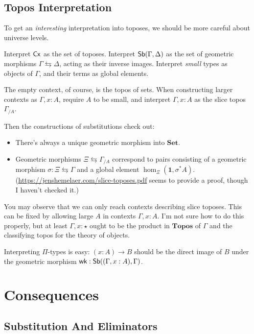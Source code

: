 \documentclass{article}
\begin{document}
\subsection{Topos Interpretation}

To get an \emph{interesting} interpretation into toposes, we should be more careful about universe levels.

Interpret \(\mathsf{Cx}\) as the set of toposes. Interpret \(\mathsf{Sb}(\Gamma, \Delta)\)
as the set of geometric morphisms \(\Gamma \leftrightarrows \Delta\), acting as their inverse images.
Interpret \emph{small} types as objects of \(\Gamma\), and their terms as global elements.

The empty context, of course, is the topos of sets.
When constructing larger contexts as \(\Gamma, x : A\), require \(A\) to be small,
and interpret \(\Gamma, x : A\) as the slice topos \(\Gamma_{/A}\).

Then the constructions of substitutions check out:
\begin{itemize}
    \item There's always a unique geometric morphism into \(\mathbf{Set}\).
    \item Geometric morphisms \(\Xi \leftrightarrows \Gamma_{/A}\) correspond to pairs consisting of a geometric morphism \(\sigma : \Xi \leftrightarrows \Gamma\) and a global element \(\hom_\Xi(\mathbf{1},\sigma^*A)\).
    (\url{https://jenshemelaer.com/slice-toposes.pdf} seems to provide a proof, though I haven't checked it.)
\end{itemize}

You may observe that we can only reach contexts describing slice toposes.
This can be fixed by allowing large \(A\) in contexts \(\Gamma, x : A\).
I'm not sure how to do this properly, but at least \(\Gamma, x : \star\) ought to be the product in \(\mathbf{Topos}\)
of \(\Gamma\) and the classifying topos for the theory of objects.

Interpreting \(\Pi\)-types is easy: \((x : A) \to B\) should be the direct image of \(B\) under the geometric morphism \(\mathsf{wk} : \mathsf{Sb}((\Gamma, x : A),\Gamma)\).

\section{Consequences}

\subsection{Substitution And Eliminators}
\end{document}
